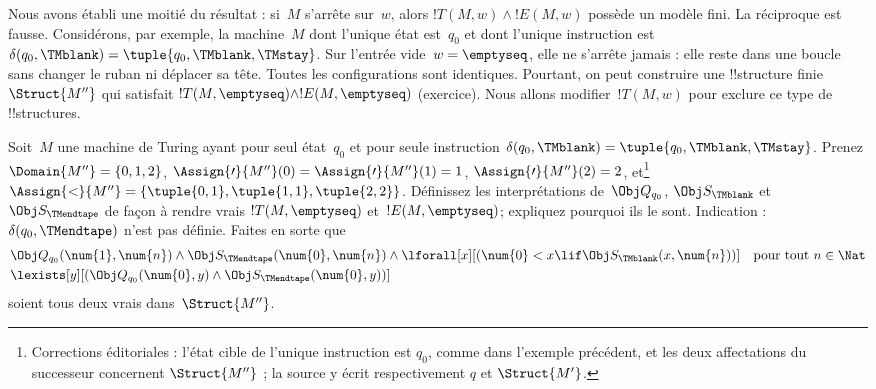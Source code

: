 \documentclass[../../../include/open-logic-section]{subfiles}
\begin{document}
\begin{explain}
Nous avons établi une moitié du résultat : si~$M$ s'arrête sur~$w$,
alors $!T(M,w)\land !E(M,w)$ possède un modèle fini. La réciproque
est fausse. Considérons, par exemple, la machine~$M$ dont l'unique
état est~$q_0$ et dont l'unique instruction est
$\delta(q_0,\TMblank)=\tuple{q_0,\TMblank,\TMstay}$.
Sur l'entrée vide~$w=\emptyseq$, elle ne s'arrête jamais : elle
reste dans une boucle sans changer le ruban ni déplacer sa tête.
Toutes les configurations sont identiques. Pourtant, on peut
construire une !!{structure} finie~$\Struct{M''}$ qui satisfait
$!T(M,\emptyseq)\land !E(M,\emptyseq)$ (exercice).
Nous allons modifier~$!T(M,w)$ pour exclure ce type de
!!{structure}s.

\begin{prob}
Soit~$M$ une machine de Turing ayant pour seul état~$q_0$
et pour seule instruction
$\delta(q_0,\TMblank)=\tuple{q_0,\TMblank,\TMstay}$.
Prenez $\Domain{M''}=\{0,1,2\}$,
$\Assign{\prime}{M''}(0)=\Assign{\prime}{M''}(1)=1$,
$\Assign{\prime}{M''}(2)=2$, et\footnote{Corrections éditoriales : l'état cible de l'unique instruction est $q_0$, comme dans l'exemple précédent, et les deux affectations du successeur concernent $\Struct{M''}$ ; la source y écrit respectivement $q$ et $\Struct{M'}$.}
$\Assign{<}{M''}=\{\tuple{0,1},\tuple{1,1},\tuple{2,2}\}$.
Définissez les interprétations de~$\Obj Q_{q_0}$,
$\Obj S_{\TMblank}$ et~$\Obj S_{\TMendtape}$ de façon à rendre
vrais $!T(M,\emptyseq)$ et~$!E(M,\emptyseq)$; expliquez pourquoi
ils le sont. Indication : $\delta(q_0,\TMendtape)$ n'est pas
définie. Faites en sorte que
\begin{align*}
& \Obj Q_{q_0}(\num{1},\num{n})\land
  \Obj S_{\TMendtape}(\num{0},\num{n})\land
  \lforall[x][(\num{0}<x\lif
  \Obj S_\TMblank(x,\num{n}))]
  \text{\quad pour tout $n\in\Nat$}\\
& \lexists[y][(\Obj Q_{q_0}(\num{0},y)\land
  \Obj S_{\TMendtape}(\num{0},y))]
\end{align*}
soient tous deux vrais dans~$\Struct{M''}$.
\end{prob}
\end{explain}
\end{document}
